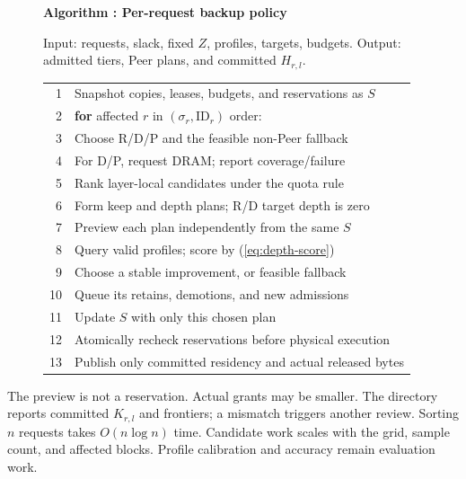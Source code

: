 \begin{figure}[t]
  \raggedright
  \label{alg:placement}
  \noindent\textbf{Algorithm \thedesignalgorithm: Per-request backup policy}
  \par\smallskip
  \noindent Input: requests, slack, fixed $Z$, profiles, targets, budgets.
  Output: admitted tiers, Peer plans, and committed $H_{r,l}$.
  \par\smallskip
  \begin{tabularx}{\columnwidth}{@{}r@{\quad}X@{}}
    \toprule
    1 & Snapshot copies, leases, budgets, and reservations as $S$ \\
    2 & \textbf{for} affected $r$ in $(\sigma_r,\mathrm{ID}_r)$ order: \\
    3 & \quad Choose R/D/P and the feasible non-Peer fallback \\
    4 & \quad For D/P, request DRAM; report coverage/failure \\
    5 & \quad Rank layer-local candidates under the quota rule \\
    6 & \quad Form keep and depth plans; R/D target depth is zero \\
    7 & \quad Preview each plan independently from the same $S$ \\
    8 & \quad Query valid profiles; score by (\ref{eq:depth-score}) \\
    9 & \quad Choose a stable improvement, or feasible fallback \\
    10 & \quad Queue its retains, demotions, and new admissions \\
    11 & \quad Update $S$ with only this chosen plan \\
    12 & Atomically recheck reservations before physical execution \\
    13 & Publish only committed residency and actual released bytes \\
    \bottomrule
  \end{tabularx}
\end{figure}

The preview is not a reservation. Actual grants may be smaller. The
directory reports committed $K_{r,l}$ and frontiers; a mismatch triggers
another review. Sorting $n$ requests takes $O(n\log n)$ time. Candidate
work scales with the grid, sample count, and affected blocks. Profile
calibration and accuracy remain evaluation work.

